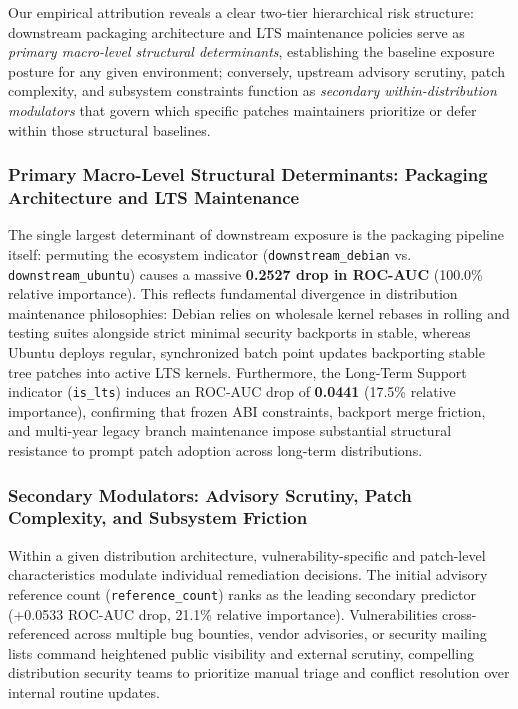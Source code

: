 \documentclass[final,5p,times,twocolumn]{elsarticle}
\begin{document}
Our empirical attribution reveals a clear two-tier hierarchical risk structure: downstream packaging architecture and LTS maintenance policies serve as \textit{primary macro-level structural determinants}, establishing the baseline exposure posture for any given environment; conversely, upstream advisory scrutiny, patch complexity, and subsystem constraints function as \textit{secondary within-distribution modulators} that govern which specific patches maintainers prioritize or defer within those structural baselines.

\subsubsection{Primary Macro-Level Structural Determinants: Packaging Architecture and LTS Maintenance}
The single largest determinant of downstream exposure is the packaging pipeline itself: permuting the ecosystem indicator (\texttt{downstream\_debian} vs. \texttt{downstream\_ubuntu}) causes a massive \textbf{0.2527 drop in ROC-AUC} (100.0\% relative importance). This reflects fundamental divergence in distribution maintenance philosophies: Debian relies on wholesale kernel rebases in rolling and testing suites alongside strict minimal security backports in stable, whereas Ubuntu deploys regular, synchronized batch point updates backporting stable tree patches into active LTS kernels. 
Furthermore, the Long-Term Support indicator (\texttt{is\_lts}) induces an ROC-AUC drop of \textbf{0.0441} (17.5\% relative importance), confirming that frozen ABI constraints, backport merge friction, and multi-year legacy branch maintenance impose substantial structural resistance to prompt patch adoption across long-term distributions.

\subsubsection{Secondary Modulators: Advisory Scrutiny, Patch Complexity, and Subsystem Friction}
Within a given distribution architecture, vulnerability-specific and patch-level characteristics modulate individual remediation decisions. The initial advisory reference count (\texttt{reference\_count}) ranks as the leading secondary predictor (+0.0533 ROC-AUC drop, 21.1\% relative importance). Vulnerabilities cross-referenced across multiple bug bounties, vendor advisories, or security mailing lists command heightened public visibility and external scrutiny, compelling distribution security teams to prioritize manual triage and conflict resolution over internal routine updates.
\end{document}
